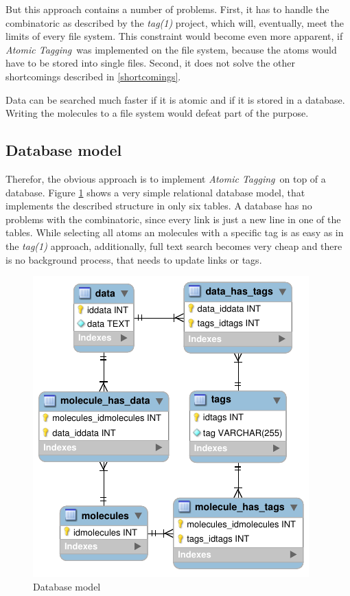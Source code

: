 \documentclass[12pt,a4paper,notitlepage,twocolumn,oneside]{article}
\newcommand{\at}{{\emph{Atomic Tagging}}}
\begin{document}
But this approach contains a number of problems. First, it has to handle the combinatoric as described by the \emph{tag(1)} project, which will, eventually, meet the limits of every file system. This constraint would become even more apparent, if \at\ was implemented on the file system, because the atoms would have to be stored into single files. Second, it does not solve the other shortcomings described in \ref{shortcomings}. 

Data can be searched much faster if it is atomic and if it is stored in a database. Writing the molecules to a file system would defeat part of the purpose.

\subsection{Database model}
Therefor, the obvious approach is to implement \at\ on top of a database. Figure \ref{dbmodel} shows a very simple relational database model, that implements the described structure in only six tables. A database has no problems with the combinatoric, since every link is just a new line in one of the tables. While selecting all atoms an molecules with a specific tag is as easy as in the \emph{tag(1)} approach, additionally, full text search becomes very cheap and there is no background process, that needs to update links or tags.

\begin{figure}[ht]
\centering
\includegraphics{dbmodel.pdf}
\caption{Database model}
\label{dbmodel}
\end{figure}
\end{document}
